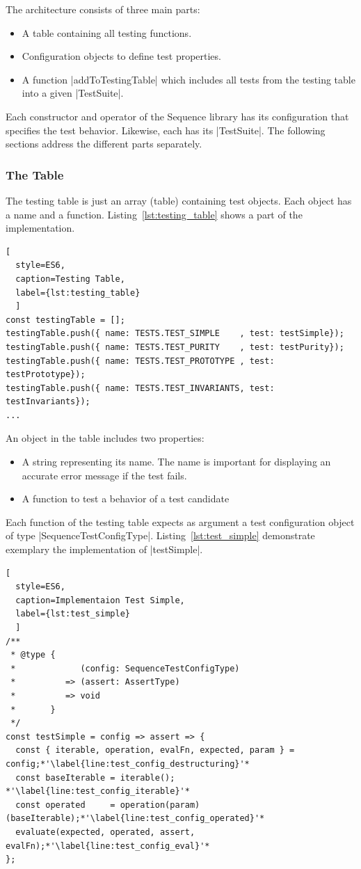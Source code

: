 The architecture consists of three main parts:
\begin{itemize}
  \item{A table containing all testing functions.}
  \item{Configuration objects to define test properties.}
  \item{A function |addToTestingTable| which includes all tests from the testing
    table into a given |TestSuite|.}
\end{itemize}

Each constructor and operator of the Sequence library has its configuration
that specifies the test behavior. Likewise, each has its |TestSuite|. 
The following sections address the different parts separately.

\subsubsection{The Table}
\label{subsub:The Table}
The testing table is just an array (table) containing test objects.
Each object has a name and a function. Listing~\ref{lst:testing_table} shows a 
part of the implementation.

\begin{lstlisting}[
  style=ES6, 
  caption=Testing Table,
  label={lst:testing_table}
  ]
const testingTable = [];
testingTable.push({ name: TESTS.TEST_SIMPLE    , test: testSimple});
testingTable.push({ name: TESTS.TEST_PURITY    , test: testPurity});
testingTable.push({ name: TESTS.TEST_PROTOTYPE , test: testPrototype});
testingTable.push({ name: TESTS.TEST_INVARIANTS, test: testInvariants});
...
\end{lstlisting}

An object in the table includes two properties:
\begin{itemize}
\item{A string representing its name. The name is important for displaying an accurate error message if the test fails.}
\item{A function to test a behavior of a test candidate}
\end{itemize}

Each function of the testing table expects as argument a test configuration
object of type |SequenceTestConfigType|.
Listing~\ref{lst:test_simple} demonstrate exemplary the
implementation of |testSimple|.

\begin{lstlisting}[
  style=ES6, 
  caption=Implementaion Test Simple,
  label={lst:test_simple}
  ]
/**
 * @type {
 *             (config: SequenceTestConfigType)
 *          => (assert: AssertType)
 *          => void
 *       }
 */
const testSimple = config => assert => {
  const { iterable, operation, evalFn, expected, param } = config;*'\label{line:test_config_destructuring}'*
  const baseIterable = iterable(); *'\label{line:test_config_iterable}'*
  const operated     = operation(param)(baseIterable);*'\label{line:test_config_operated}'*
  evaluate(expected, operated, assert, evalFn);*'\label{line:test_config_eval}'*
};
\end{lstlisting}

